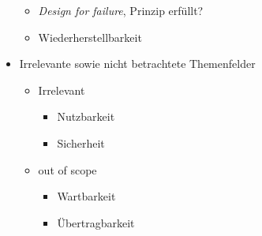 \begin{itemize}
\begin{itemize}
		\item \emph{Design for failure}, Prinzip erfüllt?
		\item Wiederherstellbarkeit
	\end{itemize}
	\item Irrelevante sowie nicht betrachtete Themenfelder
	\begin{itemize}
		\item Irrelevant
		\begin{itemize}
			\item Nutzbarkeit
			\item Sicherheit
		\end{itemize}
		\item out of scope
		\begin{itemize}
			\item Wartbarkeit
			\item Übertragbarkeit
		\end{itemize}
	\end{itemize}
\end{itemize}
